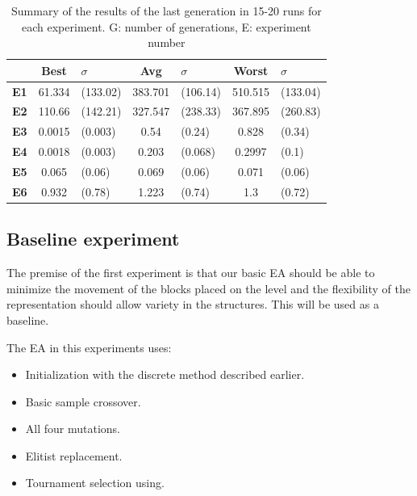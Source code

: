 \documentclass[sigconf]{acmart}
\newcommand{\myfloatalign}{\centering} %
\begin{document}
\begin{table}
	\myfloatalign
	\begin{tabular}{cclclcl}
		& \textbf{Best}& $\sigma$  &\textbf{Avg}&$\sigma$  & \textbf{Worst}&$\sigma$ \\ \hline
		\textbf{E1}&61.334&(133.02)&383.701&(106.14)&510.515&(133.04)\\  \hline
		\textbf{E2}&110.66&(142.21)&327.547&(238.33)&367.895&(260.83)  \\  \hline
		\textbf{E3}&0.0015&(0.003)&0.54&(0.24)&0.828&(0.34)   \\  \hline
		\textbf{E4}&0.0018&(0.003)&0.203&(0.068)&0.2997&(0.1)  \\  \hline
		\textbf{E5}& 0.065&(0.06)&0.069&(0.06)&0.071&(0.06)     \\  \hline 
		\textbf{E6}& 0.932&(0.78)&1.223&(0.74)&1.3&(0.72) \\  \hline
		\hline
	\end{tabular}
	\caption{Summary of the results of the last generation in 15-20 runs for each
		experiment.
		G: number of generations, E: experiment 
		number} %
	\label{t:resOver2}
\end{table}

\subsection{Baseline experiment}\label{E1}

The premise of the first experiment is that our basic EA should be able to 
minimize the movement of the blocks placed on the level and the flexibility of 
the representation should allow variety in the structures. This will
be used as a baseline.

The EA in this experiments uses:
\begin{itemize}
	\item  Initialization with the discrete method described earlier.
	\item  Basic sample crossover.
	\item  All four mutations.
	\item  Elitist replacement.
	\item  Tournament selection using.
\end{itemize}
\end{document}
